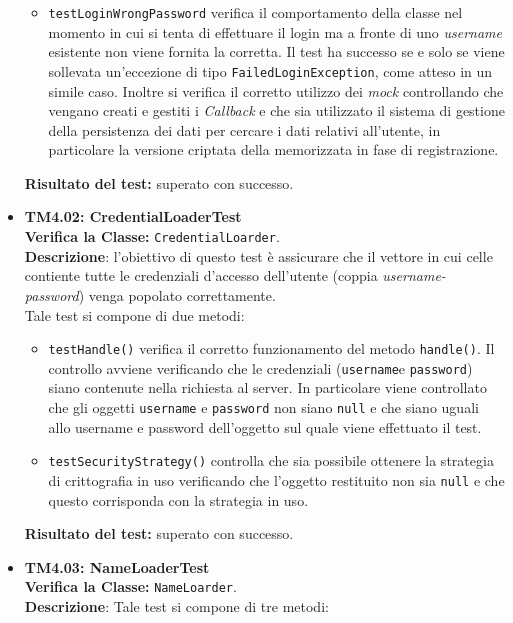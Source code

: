 \begin{itemize}
\begin{itemize}
\item \texttt{testLoginWrongPassword} verifica il comportamento della classe nel momento in cui si tenta di effettuare il login ma a fronte di uno \textit{username} esistente non viene fornita la  corretta. Il test ha successo se e solo se viene sollevata un'eccezione di tipo \texttt{FailedLoginException}, come atteso in un simile caso. Inoltre si verifica il corretto utilizzo dei \textit{mock} controllando che vengano creati e gestiti i \textit{Callback} e che sia utilizzato il sistema di gestione della persistenza dei dati per cercare i dati relativi all'utente, in particolare la versione criptata della  memorizzata in fase di registrazione.
\end{itemize}

\textbf{Risultato del test:} superato con successo.


\item \textbf{TM4.02: CredentialLoaderTest}\\
\textbf{Verifica la Classe:} \texttt{CredentialLoarder}.\\
\textbf{Descrizione}: l'obiettivo di questo test è assicurare che il vettore in cui celle contiente tutte le credenziali d'accesso dell'utente (coppia \textit{username-password}) venga popolato correttamente.\\
Tale test si compone di due metodi:
\begin{itemize}

\item \texttt{testHandle()} verifica il corretto funzionamento del metodo \texttt{handle()}. Il controllo avviene verificando che le credenziali (\texttt{username}e \texttt{password}) siano contenute nella richiesta al server. In particolare viene controllato che gli oggetti \texttt{username} e \texttt{password} non siano \texttt{null} e che siano uguali allo username e password dell'oggetto sul quale viene effettuato il test.

\item \texttt{testSecurityStrategy()} controlla che sia possibile ottenere la strategia di crittografia in uso verificando che l'oggetto restituito non sia \texttt{null} e che questo corrisponda con la strategia in uso.

\end{itemize}
\textbf{Risultato del test:} superato con successo.

\item \textbf{TM4.03: NameLoaderTest}\\
\textbf{Verifica la Classe:} \texttt{NameLoarder}.\\
\textbf{Descrizione}: %
Tale test si compone di tre metodi:
\begin{itemize}


\end{itemize}
\end{itemize}
